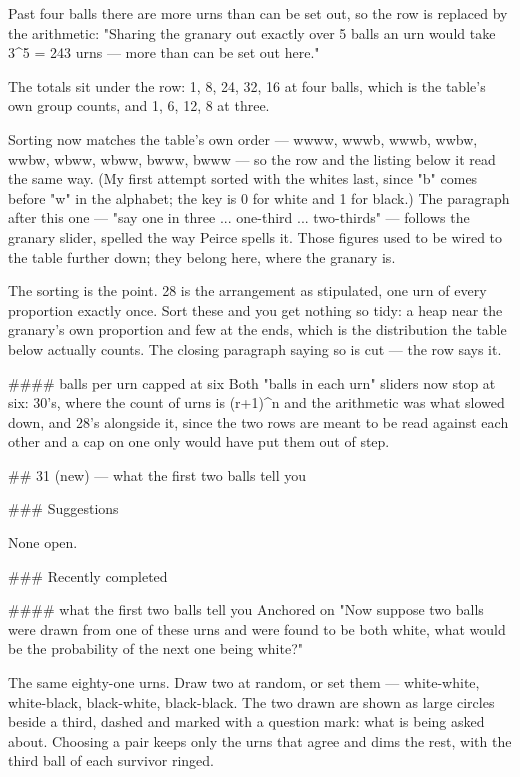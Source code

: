 Past four balls there are more urns than can be set out, so the row is replaced
by the arithmetic: "Sharing the granary out exactly over 5 balls an urn would
take 3^5 = 243 urns — more than can be set out here."

The totals sit under the row: 1, 8, 24, 32, 16 at four balls, which is the
table's own group counts, and 1, 6, 12, 8 at three.

Sorting now matches the table's own order — wwww, wwwb, wwwb, wwbw, wwbw, wbww,
wbww, bwww, bwww — so the row and the listing below it read the same way. (My
first attempt sorted with the whites last, since "b" comes before "w" in the
alphabet; the key is 0 for white and 1 for black.)
The paragraph after this one — "say one in three ... one-third ... two-thirds" —
follows the granary slider, spelled the way Peirce spells it. Those figures used
to be wired to the table further down; they belong here, where the granary is.

The sorting is the point. 28 is the arrangement as stipulated, one urn of every
proportion exactly once. Sort these and you get nothing so tidy: a heap near the
granary's own proportion and few at the ends, which is the distribution the
table below actually counts. The closing paragraph saying so is cut — the row
says it.

#### balls per urn capped at six
Both "balls in each urn" sliders now stop at six: 30's, where the count of urns
is (r+1)^n and the arithmetic was what slowed down, and 28's alongside it, since
the two rows are meant to be read against each other and a cap on one only would
have put them out of step.


## 31 (new) — what the first two balls tell you

### Suggestions

None open.

### Recently completed

#### what the first two balls tell you
Anchored on "Now suppose two balls were drawn from one of these urns and were
found to be both white, what would be the probability of the next one being
white?"

The same eighty-one urns. Draw two at random, or set them — white-white,
white-black, black-white, black-black. The two drawn are shown as large circles
beside a third, dashed and marked with a question mark: what is being asked
about. Choosing a pair keeps only the urns that agree and dims the rest, with
the third ball of each survivor ringed.


